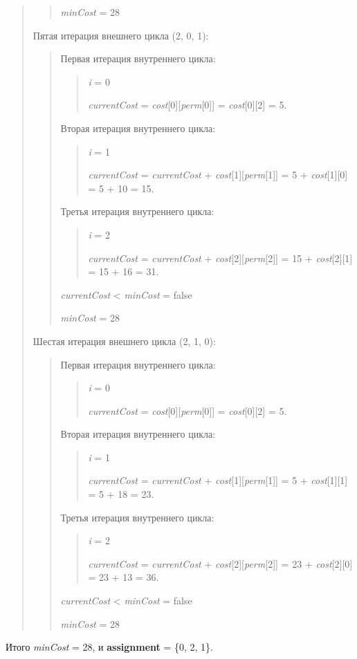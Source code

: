 \documentclass[]{article}
\begin{document}
\begin{quote}
\begin{quote}
\emph{minCost} = 28
\end{quote}
Пятая итерация внешнего цикла (2, 0, 1):
\begin{quote}
Первая итерация внутреннего цикла:

\begin{quote}
\emph{i} = 0

\emph{currentCost} = \emph{cost}{[}0{]}{[}\emph{perm}{[}0{]}{]} =
\emph{cost}{[}0{]}{[}2{]} = 5.

\end{quote}
Вторая итерация внутреннего цикла:
\begin{quote}
\emph{i} = 1

\emph{currentCost} = \emph{currentCost} +
\emph{cost}{[}1{]}{[}\emph{perm}{[}1{]}{]} = 5 +
\emph{cost}{[}1{]}{[}0{]} = 5 + 10 = 15.
\end{quote}
Третья итерация внутреннего цикла:
\begin{quote}
\emph{i} = 2

\emph{currentCost} = \emph{currentCost} +
\emph{cost}{[}2{]}{[}\emph{perm}{[}2{]}{]} = 15 +
\emph{cost}{[}2{]}{[}1{]} = 15 + 16 = 31.
\end{quote}
\emph{currentCost} \textless{} \emph{minCost} = false

\emph{minCost} = 28
\end{quote}
Шестая итерация внешнего цикла (2, 1, 0):
\begin{quote}
Первая итерация внутреннего цикла:
\begin{quote}

\emph{i} = 0

\emph{currentCost} = \emph{cost}{[}0{]}{[}\emph{perm}{[}0{]}{]} =
\emph{cost}{[}0{]}{[}2{]} = 5.

\end{quote}
Вторая итерация внутреннего цикла:
\begin{quote}
\emph{i} = 1

\emph{currentCost} = \emph{currentCost} +
\emph{cost}{[}1{]}{[}\emph{perm}{[}1{]}{]} = 5 +
\emph{cost}{[}1{]}{[}1{]} = 5 + 18 = 23.
\end{quote}
Третья итерация внутреннего цикла:
\begin{quote}
\emph{i} = 2

\emph{currentCost} = \emph{currentCost} +
\emph{cost}{[}2{]}{[}\emph{perm}{[}2{]}{]} = 23 +
\emph{cost}{[}2{]}{[}0{]} = 23 + 13 = 36.
\end{quote}
\emph{currentCost} \textless{} \emph{minCost} = false

\emph{minCost} = 28
\end{quote}
\end{quote}
Итого \emph{minCost} = 28, и \textbf{assignment} = \{0, 2, 1\}.
\end{document}
